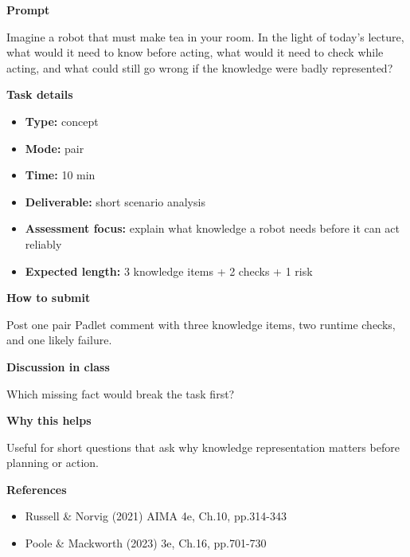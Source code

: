 \documentclass[11pt]{article}
\begin{document}
\begin{tcolorbox}[colback=white,colframe=MidnightBlue,title={Q1 Starter Scenario},fonttitle=\bfseries,breakable]
\begin{center}
\end{center}

{\large\bfseries\color{MidnightBlue} Prompt}\par\medskip
Imagine a robot that must make tea in your room. In the light of today's lecture, what would it need to know before acting, what would it need to check while acting, and what could still go wrong if the knowledge were badly represented?

{\large\bfseries\color{MidnightBlue} Task details}\par\medskip
\begin{itemize}\item \textbf{Type:} concept
\item \textbf{Mode:} pair
\item \textbf{Time:} 10 min
\item \textbf{Deliverable:} short scenario analysis
\item \textbf{Assessment focus:} explain what knowledge a robot needs before it can act reliably
\item \textbf{Expected length:} 3 knowledge items + 2 checks + 1 risk\end{itemize}

{\large\bfseries\color{MidnightBlue} How to submit}\par\medskip
Post one pair Padlet comment with three knowledge items, two runtime checks, and one likely failure.

{\large\bfseries\color{MidnightBlue} Discussion in class}\par\medskip
Which missing fact would break the task first?

{\large\bfseries\color{MidnightBlue} Why this helps}\par\medskip
Useful for short questions that ask why knowledge representation matters before planning or action.

{\large\bfseries\color{MidnightBlue} References}\par\medskip
\begin{itemize}\item Russell \& Norvig (2021) AIMA 4e, Ch.10, pp.314-343
\item Poole \& Mackworth (2023) 3e, Ch.16, pp.701-730\end{itemize}
\end{tcolorbox}
\end{document}
